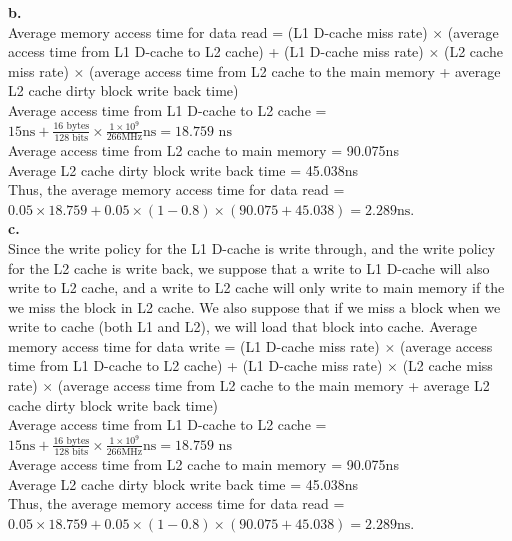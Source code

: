 \documentclass{article}
\begin{document}
\indent \textbf{b.}\\
Average memory access time for data read = (L1 D-cache miss rate) $\times$ (average access time from L1 D-cache to L2 cache) + (L1 D-cache miss rate) $\times$ (L2 cache miss rate) $\times$ (average access time from L2 cache to the main memory + average L2 cache dirty block write back time)\\
Average access time from L1 D-cache to L2 cache = $15\text{ns}+\frac{16\text{ bytes}}{128\text{ bits}}\times\frac{1\times 10^9}{266 \text{MHz}}\text{ns}=18.759\text{ ns}$\\
Average access time from L2 cache to main memory = 90.075ns\\
Average L2 cache dirty block write back time = 45.038ns\\
Thus, the average memory access time for data read = $0.05\times 18.759+0.05\times (1-0.8)\times (90.075+45.038)=2.289\text{ns}$.\\

\indent \textbf{c.}\\
Since the write policy for the L1 D-cache is write through, and the write policy for the L2 cache is write back, we suppose that a write to L1 D-cache will also write to L2 cache, and a write to L2 cache will only write to main memory if the we miss the block in L2 cache. We also suppose that if we miss a block when we write to cache (both L1 and L2), we will load that block into cache.
Average memory access time for data write = (L1 D-cache miss rate) $\times$ (average access time from L1 D-cache to L2 cache) + (L1 D-cache miss rate) $\times$ (L2 cache miss rate) $\times$ (average access time from L2 cache to the main memory + average L2 cache dirty block write back time)\\
Average access time from L1 D-cache to L2 cache = $15\text{ns}+\frac{16\text{ bytes}}{128\text{ bits}}\times\frac{1\times 10^9}{266 \text{MHz}}\text{ns}=18.759\text{ ns}$\\
Average access time from L2 cache to main memory = 90.075ns\\
Average L2 cache dirty block write back time = 45.038ns\\
Thus, the average memory access time for data read = $0.05\times 18.759+0.05\times (1-0.8)\times (90.075+45.038)=2.289\text{ns}$.\\
\end{document}
